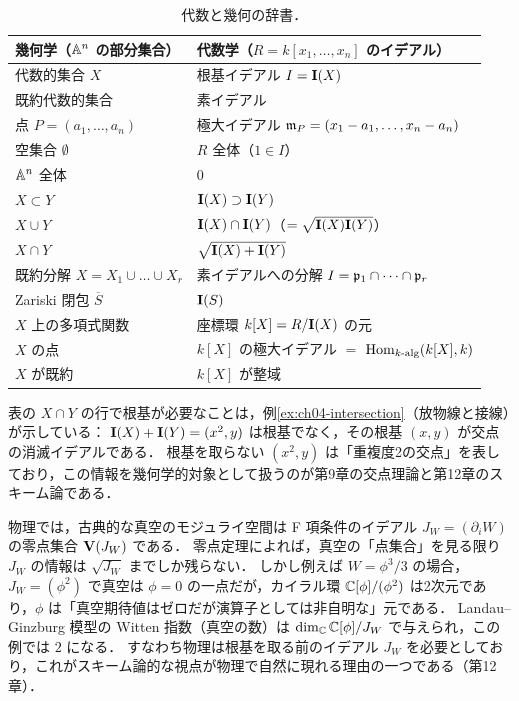 \begin{table}[H]
\centering
\renewcommand{\arraystretch}{1.3}
\begin{tabular}{l|l}
\textbf{幾何学}（$\mathbb{A}^n$ の部分集合） & \textbf{代数学}（$R=k[x_1,\dots,x_n]$ のイデアル） \\ \hline
代数的集合 $X$ & 根基イデアル $I=\mathbf{I}(X)$ \\
既約代数的集合 & 素イデアル \\
点 $P=(a_1,\dots,a_n)$ & 極大イデアル $\mathfrak{m}_P=(x_1-a_1,\dots,x_n-a_n)$ \\
空集合 $\emptyset$ & $R$ 全体（$1\in I$） \\
$\mathbb{A}^n$ 全体 & $0$ \\
$X\subset Y$ & $\mathbf{I}(X)\supset\mathbf{I}(Y)$ \\
$X\cup Y$ & $\mathbf{I}(X)\cap\mathbf{I}(Y)$（$=\sqrt{\mathbf{I}(X)\mathbf{I}(Y)}$） \\
$X\cap Y$ & $\sqrt{\mathbf{I}(X)+\mathbf{I}(Y)}$ \\
既約分解 $X=X_1\cup\dots\cup X_r$ & 素イデアルへの分解 $I=\mathfrak{p}_1\cap\cdots\cap\mathfrak{p}_r$ \\
Zariski 閉包 $\overline S$ & $\mathbf{I}(S)$ \\
$X$ 上の多項式関数 & 座標環 $k[X]=R/\mathbf{I}(X)$ の元 \\
$X$ の点 & $k[X]$ の極大イデアル $=$ $\operatorname{Hom}_{k\text{-alg}}(k[X],k)$ \\
$X$ が既約 & $k[X]$ が整域 \\
\end{tabular}
\caption{代数と幾何の辞書．}
\label{tab:ch04-dictionary}
\end{table}

表の $X\cap Y$ の行で根基が必要なことは，例\ref{ex:ch04-intersection}（放物線と接線）が示している：
$\mathbf{I}(X)+\mathbf{I}(Y)=(x^2,y)$ は根基でなく，その根基 $(x,y)$ が交点の消滅イデアルである．
根基を取らない $(x^2,y)$ は「重複度2の交点」を表しており，この情報を幾何学的対象として扱うのが第9章の交点理論と第12章のスキーム論である．

\begin{physbox}[古典的な真空と量子的な真空]
物理では，古典的な真空のモジュライ空間は F 項条件のイデアル $J_W=(\partial_i W)$ の零点集合 $\mathbf{V}(J_W)$ である．
零点定理によれば，真空の「点集合」を見る限り $J_W$ の情報は $\sqrt{J_W}$ までしか残らない．
しかし例えば $W=\phi^3/3$ の場合，$J_W=(\phi^2)$ で真空は $\phi=0$ の一点だが，カイラル環 $\mathbb{C}[\phi]/(\phi^2)$ は2次元であり，$\phi$ は「真空期待値はゼロだが演算子としては非自明な」元である．
Landau--Ginzburg 模型の Witten 指数（真空の数）は $\dim_{\mathbb{C}}\mathbb{C}[\phi]/J_W$ で与えられ，この例では $2$ になる．
すなわち物理は根基を取る前のイデアル $J_W$ を必要としており，これがスキーム論的な視点が物理で自然に現れる理由の一つである（第12章）．
\end{physbox}

